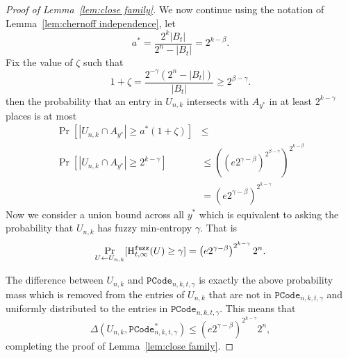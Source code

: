 \begin{proof}[Proof of Lemma~\ref{lem:close family}]
\noindent
We now continue using the notation of Lemma~\ref{lem:chernoff independence}, let 
\[
a^* =\frac{2^k|B_t|}{2^n - |B_t|}=2^{k-\beta}.
\]
Fix the value of $\zeta$ such that 
\[1+\zeta = \frac{2^{-\gamma}(2^n - |B_t|)}{|B_t|} \ge 2^{\beta-\gamma}. \]
then the probability that an entry in $U_{n,k}$ intersects with $A_{y^*}$ in at least $2^{k-\gamma}$ places is at most 
\begin{align*}
\Pr[|U_{n,k} \cap A_{y^*}| \ge a^*(1+\zeta)] &\le \\
\Pr[| U_{n,k} \cap A_{y^*} | \ge 2^{k-\gamma}] &\le \left(\left(e2^{\gamma-\beta}\right)^{2^{\beta-\gamma}}\right)^{2^{k-\beta}} \\&= \left(e2^{\gamma-\beta}\right)^{2^{k-\gamma}}
\end{align*}
Now we consider a union bound across all $y^*$ which is equivalent to asking the probability that $U_{n,k}$ has fuzzy min-entropy $\gamma$.  That is
\[
\Pr_{U\leftarrow U_{n,k}}[\mathrm{H}^{\mathtt{fuzz}}_{t,\infty}(U)\ge \gamma] = \left(e2^{\gamma-\beta}\right)^{2^{k-\gamma}}2^n.
\]

The difference between $U_{n,k}$ and $\mathtt{PCode}_{n, k, t, \gamma}$ is exactly the above probability mass which is removed from the entries of $U_{n,k}$ that are not in $\mathtt{PCode}_{n, k, t, \gamma}$ and uniformly distributed to the entries in $\mathtt{PCode}_{n, k, t, \gamma}$.  This means that 
\[
\Delta(U_{n,k}, \mathtt{PCode}_{n, k, t, \gamma}^{*}) \le \left(e2^{\gamma-\beta}\right)^{2^{k-\gamma}}2^n,
\]
completing the proof of Lemma~\ref{lem:close family}.
\end{proof}


